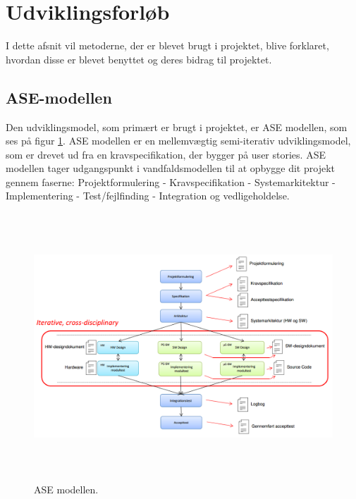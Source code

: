 \section{Udviklingsforløb}
I dette afsnit vil metoderne, der er blevet brugt i projektet, blive forklaret, hvordan disse er blevet benyttet og deres bidrag til projektet.

\subsection{ASE-modellen} \label{sec:ASEModel}
Den udviklingsmodel, som primært er brugt i projektet, er ASE modellen, som ses på figur \ref{fig:ASE}. ASE modellen \cite{ASE} er en mellemvægtig semi-iterativ udviklingsmodel, som er drevet ud fra en kravspecifikation, der bygger på user stories. ASE modellen tager udgangspunkt i vandfaldsmodellen til at opbygge dit projekt gennem faserne: Projektformulering - Kravspecifikation - Systemarkitektur -  Implementering -  Test/fejlfinding -  Integration og vedligeholdelse\cite{ASE}.

\begin{figure} [H]
	\begin{center}
		\includegraphics[height=10cm, width=12cm]{Udviklingsforlob/ASEModellen}
	\end{center}
	\caption{ASE modellen. \cite{ASE}}
	\label{fig:ASE}
\end{figure}

